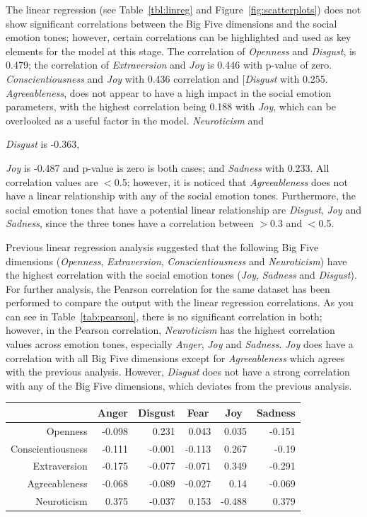 \documentclass[graybox]{svmult}
\begin{document}
{The linear regression (see Table~\ref{tbl:linreg} and
Figure~\ref{fig:scatterplots}) does not show significant correlations
between the Big Five dimensions and the social emotion tones; however,
certain correlations can be highlighted and used as key elements for
the model at this stage. The correlation of {\emph{Openness} and
{\emph{Disgust}}, is 0.479; the correlation of {\emph{Extraversion}}
and {\emph{Joy}} is 0.446 with p-value of
zero. {\emph{Conscientiousness}} and {\emph{Joy}} with 0.436
correlation and [\emph{Disgust}} with 0.255. {\emph{Agreeableness}},
does not appear to have a high impact in the social emotion
parameters, with the highest correlation being 0.188 with
{\emph{Joy}}, which can be overlooked as a useful factor in the
model. {\emph{Neuroticism}} and {\emph{Disgust} is -0.363, {\emph{Joy}
is -0.487 and p-value is zero is both cases; and {\emph{Sadness}} with
0.233. All correlation values are $<$0.5; however, it is noticed that
{\emph{Agreeableness}} does not have a linear relationship with any of
the social emotion tones. Furthermore, the social emotion tones that
have a potential linear relationship are {\emph{Disgust}},
{\emph{Joy}} and {\emph{Sadness}}, since the three tones have a
correlation between $>$0.3 and $<$0.5.

Previous linear regression analysis suggested that the following Big
Five dimensions ({\emph{Openness}}, {\emph{Extraversion}},
{\emph{Conscientiousness}} and {\emph{Neuroticism}}) have the highest
correlation with the social emotion tones ({\emph{Joy}},
{\emph{Sadness}} and {\emph{Disgust}}). For further analysis, the
Pearson correlation for the same dataset has been performed to compare
the output with the linear regression correlations. As you can see in
Table~\ref{tab:pearson}, there is no significant correlation in both;
however, in the Pearson correlation, {\emph{Neuroticism}} has the
highest correlation values across emotion tones, especially
{\emph{Anger}}, {\emph{Joy}} and {\emph{Sadness}}. {\emph{Joy}} does
have a correlation with all Big Five dimensions except for
{\emph{Agreeableness}} which agrees with the previous
analysis. However, {\emph{Disgust}} does not have a strong correlation
with any of the Big Five dimensions, which deviates from the previous
analysis.

\begin{table}[!ht]
\centering
\begin{tabular}{@{}rrrrrr@{}}
\toprule
                  & \multicolumn{1}{c}{Anger}  & \multicolumn{1}{c}{Disgust} & \multicolumn{1}{c}{Fear}   & \multicolumn{1}{c}{Joy}    & \multicolumn{1}{c}{Sadness} \\ 
\midrule
Openness          & -0.098 & 0.231   & 0.043  & 0.035  & -0.151  \\
Conscientiousness & -0.111 & -0.001  & -0.113 & 0.267  & -0.19   \\
Extraversion      & -0.175 & -0.077  & -0.071 & 0.349  & -0.291  \\
Agreeableness     & -0.068 & -0.089  & -0.027 & 0.14   & -0.069  \\
Neuroticism       & 0.375  & -0.037  & 0.153  & -0.488 & 0.379   \\ 


\end{tabular}
\end{table}}}}
\end{document}
